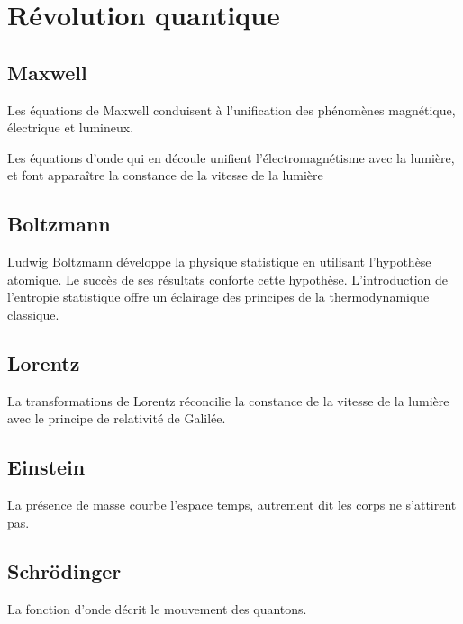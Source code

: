 
\section{Révolution quantique}
%
%
%
\subsection{Maxwell}

Les équations de Maxwell conduisent à l'unification des phénomènes magnétique, électrique et lumineux.

Les équations d'onde qui en découle unifient l'électromagnétisme avec la lumière, et font apparaître la constance de la vitesse de la lumière

\subsection{Boltzmann}

Ludwig Boltzmann développe la physique statistique en utilisant l'hypothèse atomique. Le succès de ses résultats conforte cette hypothèse. L'introduction de l'entropie statistique offre un éclairage des principes de la thermodynamique classique.

\subsection{Lorentz}
La transformations de Lorentz réconcilie la constance de la vitesse de la lumière avec le principe de relativité de Galilée.

\subsection{Einstein}
La présence de masse courbe l'espace temps, autrement dit les corps ne s'attirent pas.

\subsection{Schrödinger}
La fonction d'onde décrit le mouvement des quantons.
